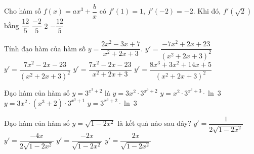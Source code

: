 \begin{ex}%
	Cho hàm số $f(x)=ax^3+\dfrac{b}{x}$  có $f'(1)=1$, $f'(-2)=-2$. Khi đó, $f'\left(\sqrt{2}\right)$ bằng
	\choice 
		{$\dfrac{12}{5}$} 
		{\True $\dfrac{-2}{5}$} 
		 {$2$}
		{$-\dfrac{12}{5}$} 
\end{ex}

\begin{ex}%
	Tính đạo hàm của  hàm số $y=\dfrac{2x^2-3x+7}{x^2+2x+3}$.
	 \choice
		{$y'=\dfrac{-7x^2+2x+23}{(x^2+2x+3)^2}$} 
		 {\True $y'=\dfrac{7x^2-2x-23}{(x^2+2x+3)^2}$}
		{$y'=\dfrac{7x^2-2x-23}{x^2+2x+3}$} 
		{$y'=\dfrac{8x^3+3x^2+14x+5}{(x^2+2x+3)^2}$} 
\end{ex}

\begin{ex}%
	Đạo hàm của hàm số  $y=3^{x^{3}+2}$ là
	 \choice
		{$y=3x^{2} \cdot 3^{x^{3}+2}$} 
		 {\True $y=x^{2} \cdot 3^{x^{3}+3} \cdot \ln~3$}
		{$y=3x^{2} \cdot  (x^{3}+2) \cdot 3^{x^{3}+1}$}
		{$y=3^{x^{3}+2}  \cdot \ln~3$}
\end{ex}

\begin{ex}%
	Đạo hàm của hàm số $y=\sqrt{1-2x^2}$ là kết quả nào sau đây? 
	\choice 
		 {$y'=\dfrac{1}{2\sqrt{1-2x^2}}$}
		 {$y'=\dfrac{-4x}{2\sqrt{1-2x^2}}$}
		{\True $y'=\dfrac{-2x}{\sqrt{1-2x^2}}$} 
		{$y'=\dfrac{2x}{\sqrt{1-2x^2}}$} 
\end{ex}

